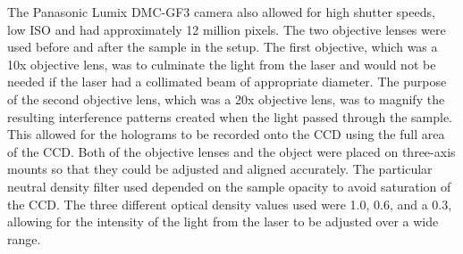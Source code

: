 The Panasonic Lumix DMC-GF3 camera also allowed for high shutter speeds, low ISO
and had approximately 12 million pixels.
The two objective lenses were used
before and after the sample in the setup. The first objective, which was a 10x
objective lens, was to %
culminate the light from the laser and would not be needed if the laser
had a collimated beam of appropriate diameter. The purpose of the second
objective lens, which was a 20x
objective lens, was to
magnify the resulting interference patterns created
when the light passed through the sample. This allowed for the holograms to be
recorded onto the CCD using the full area of the CCD.
Both of the objective lenses and the object were placed on
three-axis mounts so that they could be adjusted and aligned accurately.
The particular neutral density filter used depended on the sample opacity to avoid
saturation of the CCD.
The three different optical density values used were 1.0, 0.6,
and a 0.3, allowing for the intensity of the light from the laser to be
adjusted over a wide range.


%
